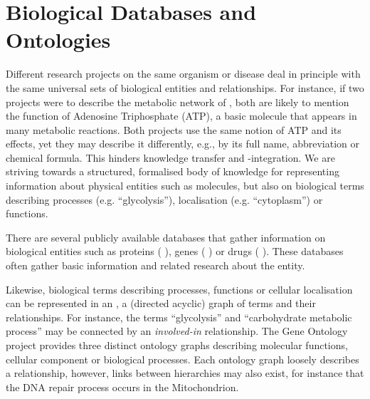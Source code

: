 \documentclass[
	fontsize=10pt, %
	twoside=false, %
	secnumdepth=1, %
  toc=indentunnumbered %
]{kaobook}
\begin{document}
\section{Biological Databases and Ontologies}
\label{sec:ontologies}



Different research projects on the same organism or disease deal in principle
with the same universal sets of biological entities and relationships. For
instance, if two projects were to describe the metabolic network of \ecoli, both
are likely to mention the function of Adenosine Triphosphate (ATP), a basic
molecule that appears in many metabolic reactions. Both projects use the same
notion of ATP and its effects, yet they may describe it differently, e.g., by
its full name, abbreviation or
chemical formula. This hinders knowledge transfer and -integration. We are
striving towards a structured, formalised body of knowledge for representing
information about physical entities such as molecules, but also on biological terms
describing processes (e.g. ``glycolysis''), localisation (e.g. ``cytoplasm'') or
functions.

There are several publicly available databases that gather information on
biological entities such as proteins (
\cite{theuniprotconsortium_UniProtUniversalProtein_2021}), genes
( \cite{maglott_EntrezGeneGenecentered_2005}) or drugs
( \cite{wishart_DrugBankKnowledgebaseDrugs_2008}). These
databases often gather basic information and related research about the entity.

Likewise, biological terms describing processes, functions or cellular
localisation can be represented in an , a (directed acyclic) graph
of terms and their relationships. For instance, the terms ``glycolysis'' and
``carbohydrate metabolic process'' may be connected by an \textit{involved-in}
relationship. The Gene Ontology project \cite{ashburner_GeneOntologyTool_2000}
provides three distinct ontology graphs describing molecular functions, cellular
component or biological processes. Each ontology graph loosely describes a
relationship, however, links between hierarchies may also exist, for instance
that the DNA repair process occurs in the Mitochondrion.
\end{document}
